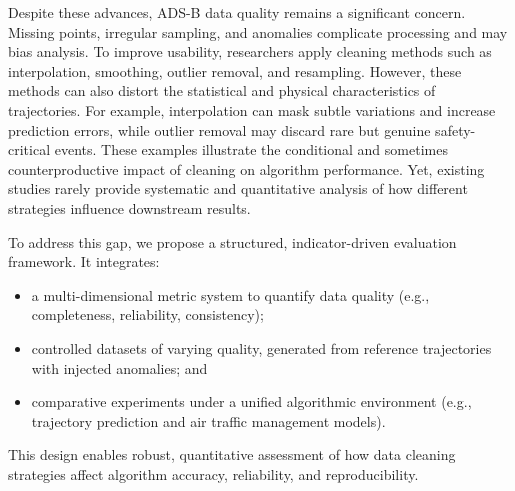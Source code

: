 Despite these advances, ADS-B data quality remains a significant concern. Missing points, irregular sampling, and anomalies complicate processing and may bias analysis. To improve usability, researchers apply cleaning methods such as interpolation, smoothing, outlier removal, and resampling. However, these methods can also distort the statistical and physical characteristics of trajectories. For example, interpolation can mask subtle variations and increase prediction errors, while outlier removal may discard rare but genuine safety-critical events. These examples illustrate the conditional and sometimes counterproductive impact of cleaning on algorithm performance. Yet, existing studies rarely provide systematic and quantitative analysis of how different strategies influence downstream results.

To address this gap, we propose a structured, indicator-driven evaluation framework. It integrates:

\begin{itemize}
  \item a multi-dimensional metric system to quantify data quality (e.g., completeness, reliability, consistency);
  \item controlled datasets of varying quality, generated from reference trajectories with injected anomalies; and
  \item comparative experiments under a unified algorithmic environment (e.g., trajectory prediction and air traffic management models).
\end{itemize}

This design enables robust, quantitative assessment of how data cleaning strategies affect algorithm accuracy, reliability, and reproducibility.